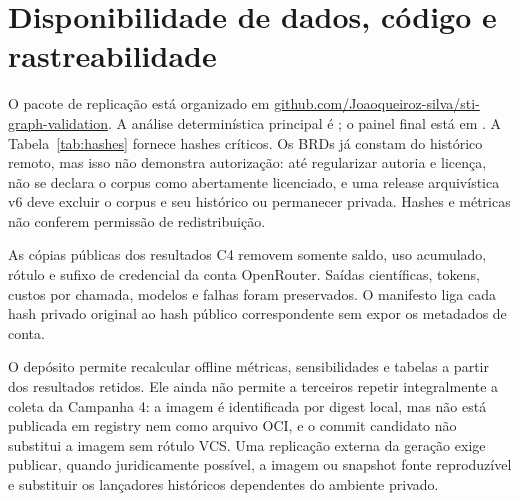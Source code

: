 \documentclass[11pt,a4paper]{article}
\begin{document}
\section*{Disponibilidade de dados, código e rastreabilidade}

O pacote de replicação está organizado em \href{https://github.com/Joaoqueiroz-silva/sti-graph-validation}{github.com/Joaoqueiroz-silva/sti-graph-validation}. A análise determinística principal é ; o painel final está em . A Tabela~\ref{tab:hashes} fornece hashes críticos. Os BRDs já constam do histórico remoto, mas isso não demonstra autorização: até regularizar autoria e licença, não se declara o corpus como abertamente licenciado, e uma
release arquivística v6 deve excluir o corpus e seu histórico ou permanecer privada. Hashes e métricas não conferem permissão de redistribuição.

As cópias públicas dos resultados C4 removem somente saldo, uso acumulado, rótulo e sufixo de credencial da conta OpenRouter. Saídas científicas, tokens, custos por chamada, modelos e falhas foram preservados. O manifesto  liga cada hash privado original ao hash público correspondente sem expor os metadados de conta.

O depósito permite recalcular offline métricas, sensibilidades e tabelas a partir dos resultados retidos. Ele ainda não permite a terceiros repetir integralmente a coleta da Campanha 4: a imagem é identificada por digest local, mas não está publicada em registry nem como arquivo OCI, e o commit candidato não substitui a imagem sem rótulo VCS. Uma replicação externa da geração exige publicar, quando juridicamente possível, a imagem ou snapshot fonte reproduzível e substituir os lançadores históricos dependentes do ambiente privado.
\end{document}
